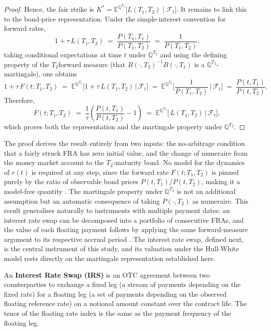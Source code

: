 \begin{proof}
    Hence, the fair strike is $K^\ast = \mathbb{E}^{\mathbb{Q}^{T_2}}\!\big[ L(T_1,T_2) \mid \mathcal{F}_t \big]$. It remains to link this to the bond-price representation. Under the simple-interest convention for forward rates,
    \[
    1 + \tau\, L(T_1,T_2) \;=\; \frac{P(T_1,T_1)}{P(T_1,T_2)} \;=\; \frac{1}{P(T_1,T_2)}.
    \]
    taking conditional expectations at time $t$ under $\mathbb{Q}^{T_2}$ and using the defining property of the $T_2$forward measure (that $B(\cdot,T_2)^{-1} B(\cdot,T_1)$ is a $\mathbb{Q}^{T_2}$-martingale), one obtains
    \[
    1 + \tau\, F(t;T_1,T_2)
    \;=\; \mathbb{E}^{\mathbb{Q}^{T_2}}\!\Big[ 1 + \tau\,L(T_1,T_2) \,\Big|\, \mathcal{F}_t \Big]
    \;=\; \mathbb{E}^{\mathbb{Q}^{T_2}}\!\Big[ \frac{1}{P(T_1,T_2)} \,\Big|\, \mathcal{F}_t \Big]
    \;=\; \frac{P(t,T_1)}{P(t,T_2)}.
    \]
    Therefore,
    \[
    F(t;T_1,T_2) \;=\; \frac{1}{\tau}\!\left(\frac{P(t,T_1)}{P(t,T_2)} - 1\right)
    \;=\; \mathbb{E}^{\mathbb{Q}^{T_2}}\!\big[\, L(T_1,T_2) \,\big|\, \mathcal{F}_t \big],
    \]
    which proves both the representation and the martingale property under $\mathbb{Q}^{T_2}$.
\end{proof}

    \noindent
    The proof derives the result entirely from two inputs: the no-arbitrage condition that a fairly struck FRA has zero initial value, and the change of numeraire from the money market account to the $T_2$-maturity bond. No model for the dynamics of $r(t)$ is required at any step, since the forward rate $F(t;T_1,T_2)$ is pinned purely by the ratio of observable bond prices $P(t,T_1)/P(t,T_2)$, making it a model-free quantity \cite{brigo2001interest}. The martingale property under $\mathbb{Q}^{T_2}$ is not an additional assumption but an automatic consequence of taking $P(\cdot,T_2)$ as numeraire. This result generalises naturally to instruments with multiple payment dates: an interest rate swap can be decomposed into a portfolio of consecutive FRAs, and the value of each floating payment follows by applying the same forward-measure argument to its respective accrual period \cite{oosterlee2019mathematical}. The interest rate swap, defined next, is the central instrument of this study, and its valuation under the Hull-White model rests directly on the martingale representation established here.

    \begin{definition} \label{def:irs}
    An \textbf{Interest Rate Swap (IRS)} is an OTC agreement between two counterparties to exchange a fixed leg (a stream of payments depending on the fixed rate) for a floating leg (a set of payments depending on the observed floating reference rate) on a notional amount constant over the contract life. The tenor of the floating rate index is the same as the payment frequency of the floating leg. \\
    \end{definition}   

